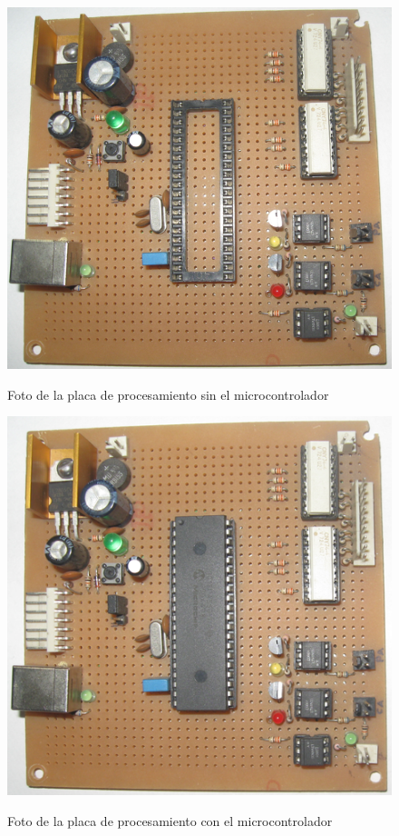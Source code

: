 \begin{figure}[htp]
  \centering
  \includegraphics[width=14cm]{./img/fotos/pic_board_picture_wo_pic.png}
  \label{fig:pic_board_picture_wo_pic}
  \caption{Foto de la placa de procesamiento sin el microcontrolador}
\end{figure}

\begin{figure}[htp]
  \centering
  \includegraphics[width=14cm]{./img/fotos/pic_board.png}
  \label{fig:pic_board}
  \caption{Foto de la placa de procesamiento con el microcontrolador}
\end{figure}

